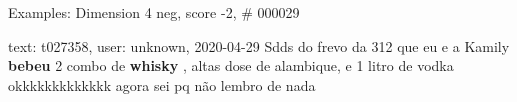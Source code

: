 \begin{frame}{Examples: Dimension 4 neg, score -2, \# 000029}
\footnotesize
\begin{alertblock}{text: t027358, user: unknown, 2020-04-29}
Sdds do frevo da 312 que eu e a Kamily \textbf{bebeu} 2 combo de 
\textbf{whisky} , altas dose de alambique, e 1 litro de vodka okkkkkkkkkkkkk 
agora sei pq não lembro de nada 
\end{alertblock}
\end{frame}

